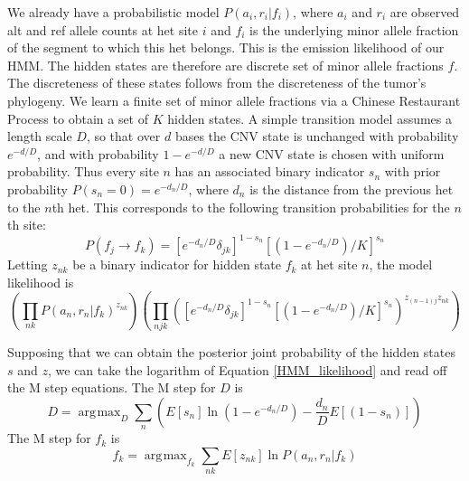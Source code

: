 \documentclass[nofootinbib,amssymb,amsmath]{revtex4}
\DeclareMathOperator*{\argmax}{\arg\!\max}
\begin{document}
We already have a probabilistic model $P(a_i, r_i | f_i)$, where $a_i$ and $r_i$ are observed alt and ref allele counts at het site $i$ and $f_i$ is the underlying minor allele fraction of the segment to which this het belongs.  This is the emission likelihood of our HMM.  The hidden states are therefore are discrete set of minor allele fractions $f$.  The discreteness of these states follows from the discreteness of the tumor's phylogeny.  We learn a finite set of minor allele fractions via a Chinese Restaurant Process to obtain a set of $K$ hidden states.  A simple transition model assumes a length scale $D$, so that over $d$ bases the CNV state is unchanged with probability $e^{-d/D}$, and with probability $1 - e^{-d/D}$ a new CNV state is chosen with uniform probability.  Thus every site $n$ has an associated binary indicator $s_n$ with prior probability $P(s_n = 0) = e^{-d_n/D}$, where $d_n$ is the distance from the previous het to the $n$th het.  This corresponds to the following transition probabilities for the $n$th site:
%
\begin{equation}
P(f_j \rightarrow f_k) = \left[ e^{-d_n/D} \delta_{jk}\right]^{1 - s_n} \left[ (1-e^{-d_n/D}) / K \right]^{s_n}
\end{equation}
%
Letting $z_{nk}$ be a binary indicator for hidden state $f_k$ at het site $n$, the model likelihood is
\begin{equation}
\left(  \prod_{nk} P(a_n, r_n | f_k)^{z_{nk}} \right) \left( \prod_{njk} \left( \left[ e^{-d_n/D} \delta_{jk}\right]^{1 - s_n} \left[ (1-e^{-d_n/D}) / K \right]^{s_n} \right)^{z_{(n-1)j} z_{nk}} \right)
\label{HMM_likelihood}
\end{equation}

Supposing that we can obtain the posterior joint probability of the hidden states $s$ and $z$, we can take the logarithm of Equation \ref{HMM_likelihood} and read off the M step equations.  The M step for $D$ is
\begin{equation}
D = \argmax_D    \sum_{n} \left( E \left[s_n  \right] \ln (1 - e^{-d_n/D}) - \frac{d_n}{D} E \left[(1-s_n)  \right] \right)
\label{M_D}
\end{equation}
The M step for $f_k$ is
\begin{equation}
f_k = \argmax_{f_k} \sum_{nk} E[z_{nk}] \ln P(a_n, r_n | f_k)
\label{M_f}
\end{equation}
\end{document}
